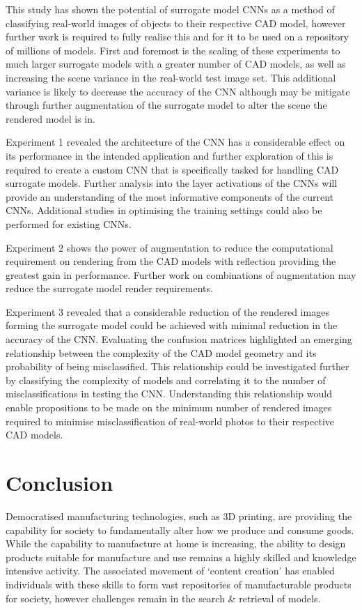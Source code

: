 \documentclass[a4paper, 11pt]{article}
\begin{document}
This study has shown the potential of surrogate model CNNs as a method of classifying real-world images of objects to their respective CAD model, however further work is required to fully realise this and for it to be used on a repository of millions of models. First and foremost is the scaling of these experiments to much larger surrogate models with a greater number of CAD models, as well as increasing the scene variance in the real-world test image set. This additional variance is likely to decrease the accuracy of the CNN although may be mitigate through further augmentation of the surrogate model to alter the scene the rendered model is in.

Experiment 1 revealed the architecture of the CNN has a considerable effect on its performance in the intended application and further exploration of this is required to create a custom CNN that is specifically tasked for handling CAD surrogate models. Further analysis into the layer activations of the CNNs will provide an understanding of the most informative components of the current CNNs. Additional studies in optimising the training settings could also be performed for existing CNNs.

Experiment 2 shows the power of augmentation to reduce the computational requirement on rendering from the CAD models with reflection providing the greatest gain in performance. Further work on combinations of augmentation may reduce the surrogate model render requirements.

Experiment 3 revealed that a considerable reduction of the rendered images forming the surrogate model could be achieved with minimal reduction in the accuracy of the CNN. Evaluating the confusion matrices highlighted an emerging relationship between the complexity of the CAD model geometry and its probability of being misclassified. This relationship could be investigated further by classifying the complexity of models and correlating it to the number of misclassifications in testing the CNN. Understanding this relationship would enable propositions to be made on the minimum number of rendered images required to minimise misclassification of real-world photos to their respective CAD models.


\section{Conclusion}\label{sec:con}

Democratised manufacturing technologies, such as 3D printing, are providing the capability for society to fundamentally alter how we produce and consume goods. While the capability to manufacture at home is increasing, the ability to design products suitable for manufacture and use remains a highly skilled and knowledge intensive activity. The associated movement of ‘content creation’ has enabled individuals with these skills to form vast repositories of manufacturable products for society, however challenges remain in the search \& retrieval of models.
\end{document}

